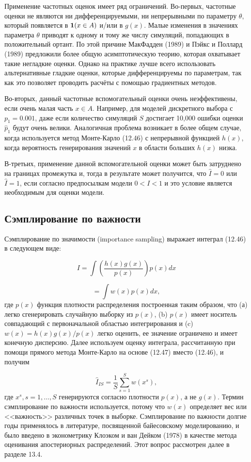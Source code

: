 Применение частотных оценок имеет ряд ограничений. Во-первых, частотные оценки не являются ни дифференцируемыми, ни непрерывными по параметру $\theta$, который появляется в ${\bf{1}}(x \in A)$ и/или в $g(x)$. Малые изменения в значениях параметра $\theta$ приводят к одному и тому же числу симуляций, попадающих в положительный ортант. По этой причине МакФадден (1989) и Пэйкс и Поллард (1989) предложили более общую асимптотическую теорию, которая охватывает такие негладкие оценки. Однако на практике лучше всего  использовать альтернативные гладкие оценки, которые дифференцируемы по параметрам, так как это позволяет проводить расчёты с помощью градиентных методов.

Во-вторых, данный частотные вспомогательный оценки очень неэффективены, если очень малая часть $x \in A$. Например, для моделей дискретного выбора с $p_1=0.001$, даже если количество симуляций $S$ достигает 10,000 ошибки оценки $\hat{p}_1$ будут очень велики. Аналогичная проблема возникает в более общем случае, когда используется метод Монте-Карло (12.46) с непрерывной функцией $h(x)$, когда вероятность генерирования значений $x$ в области больших $h(x)$ низка.

В-третьих, применение данной вспомогательной оценки может быть затруднено на границах промежутка и, тогда в результате может получится, что $\hat{I}=0$ или $\hat{I}=1$, если согласно предпосылкам модели $0<I<1$ и это условие является необходимым для оценки модели.

\subsection{Сэмплирование по важности}

Сэмплирование по значимости (importance sampling) выражает интеграл (12.46) в следующем виде:

\begin{equation}
I=\int{\left(\dfrac{h(x)g(x)}{p(x)}\right)p(x)dx}
\end{equation}

\[
=\int{w(x)p(x)dx},
\]
где $p(x)$ функция плотности распределения построенная таким образом, что (а) легко сгенерировать случайную выборку из $p(x)$, (b) $p(x)$ имеет носитель совпадающий с  первоначальной областью интегрирования и (c) $w(x)=h(x)g(x)/p(x)$ легко оценить, ее значение ограничено и имеет конечную дисперсию. Далее используем оценку интеграла, рассчитанную при помощи прямого метода Монте-Карло на основе (12.47) вместо (12.46), и получим

\begin{equation}
\hat{I}_{IS}=\dfrac{1}{S}\sum^{S}_{s=1}w(x^{s}),
\end{equation}
где $x^s, s=1,\ldots ,S$ генерируются согласно плотности $p(x)$, а не $g(x)$. Термин сэмплирование по важности используется, потому что $w(x)$ определяет вес или <<важность>> различных точек в выборке. Сэмплирование по важности долгие годы применялось в литературе, посвященной байесовскому моделированию, и было введено в эконометрику Клоэком и ван Дейком (1978) в качестве метода оценивания апостериорных распределений. Этот вопрос рассмотрен далее в разделе 13.4.

